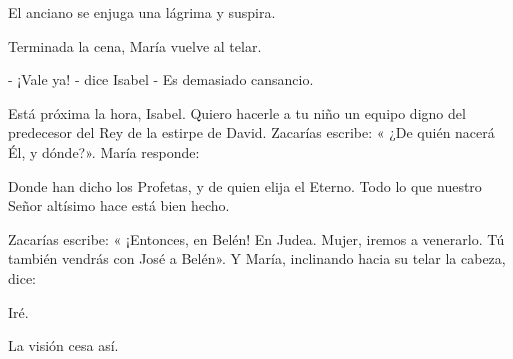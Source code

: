 \documentclass[12pt, twoside, openright]{book} %
\begin{document}
El anciano se enjuga una lágrima y suspira. 

Terminada la cena, María vuelve al telar. 

- ¡Vale ya! - dice Isabel - Es demasiado cansancio. 

Está próxima la hora, Isabel. Quiero hacerle a tu niño un equipo digno del predecesor del Rey de la estirpe de David. Zacarías escribe: « ¿De quién nacerá Él, y dónde?». María responde: 

Donde han dicho los Profetas, y de quien elija el Eterno. Todo lo que nuestro Señor altísimo hace está bien hecho. 

Zacarías escribe: « ¡Entonces, en Belén! En Judea. Mujer, iremos a venerarlo. Tú también vendrás con José a Belén». Y María, inclinando hacia su telar la cabeza, dice: 

Iré. 

La visión cesa así. 
\end{document}
